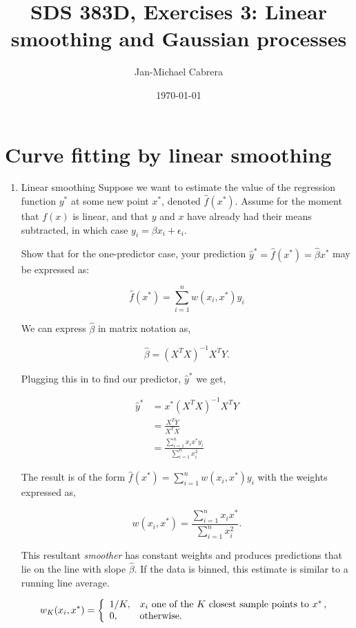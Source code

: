 \documentclass[10pt]{article}
\begin{document}
    \title{SDS 383D, Exercises 3: Linear smoothing and Gaussian processes}
    \author{Jan-Michael Cabrera}
    \date{\today}
    \maketitle

    \section*{Curve fitting by linear smoothing}

    \begin{enumerate}[label=(\Alph*)]
      \item Linear smoothing
        Suppose we want to estimate the value of the regression function $y^*$ at some new point $x^*$, denoted $\hat{f}(x^*)$. Assume for the moment that $f(x)$ is linear, and that $y$ and $x$ have already had their means subtracted, in which case $y_i = \beta x_i + \epsilon_i$.

        Show that for the one-predictor case, your prediction $\hat{y}^* = \hat{f}(x^*) = \hat{\beta} x^*$ may be expressed as:

        $$\hat{f}(x^*) = \sum_{i=1}^n w(x_i, x^*) y_i$$

        We can express $\hat{\beta}$ in matrix notation as,

        $$\hat{\beta} = (X^T X)^{-1} X^T Y.$$

        Plugging this in to find our predictor, $\hat{y}^*$ we get,

        \begin{align*}
            \hat{y}^* &= x^* (X^T X)^{-1} X^T Y \\
            &= \frac{X^T Y}{X^T X} \\
            &= \frac{\sum_{i=1}^n x_i x^* y_i}{\sum_{i=1}^n x_i^2}
        \end{align*}

        The result is of the form $\hat{f}(x^*) = \sum_{i=1}^n w(x_i, x^*) y_i$ with the weights expressed as,

        $$w(x_i, x^*) = \frac{\sum_{i=1}^n x_i x^*}{\sum_{i=1}^n x_i^2}.$$

        This resultant \textit{smoother} has constant weights and produces predictions that lie on the line with slope $\hat{\beta}$. If the data is binned, this estimate is similar to a running line average.

        $$
        w_K(x_i, x^*) = \left \{
        \begin{array}{l l}
        1/K, & \mbox{$x_i$ one of the $K$ closest sample points to $x^*$} \, ,\\
        0, & \mbox{otherwise.} \\
        \end{array}
        \right.
        $$


\end{enumerate}
\end{document}
